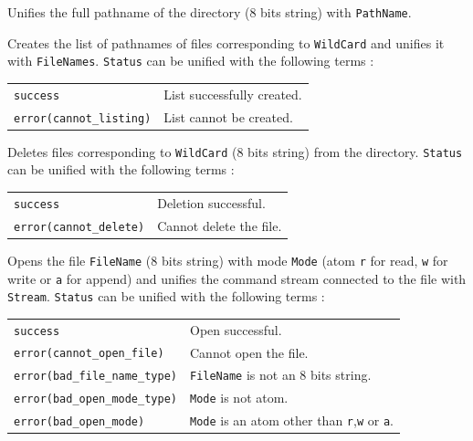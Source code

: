 \begin{itemize}

Unifies the full pathname of the directory (8 bits string)
with \verb|PathName|.

Creates the list of pathnames of files corresponding to \verb|WildCard|
and unifies it with \verb|FileNames|. \verb|Status| can be unified with the
following terms :

\vspace{1ex}
\hspace*{15mm}\begin{tabular}{l@{ $\cdots$ }l}
\verb|success| & List successfully created.\\
\verb|error(cannot_listing)| & List cannot be created.\\
\end{tabular}
\vspace{1ex}

Deletes files corresponding to \verb|WildCard| (8 bits string) from
the directory. \verb|Status| can be unified with the following terms :

\vspace{1ex}
\hspace*{15mm}\begin{tabular}{l@{ $\cdots$ }l}
\verb|success| & Deletion successful.\\
\verb|error(cannot_delete)| & Cannot delete the file.\\
\end{tabular}
\vspace{1ex}

Opens the file \verb|FileName| (8 bits string) with mode \verb|Mode|
(atom \verb|r| for read, \verb|w| for write or
\verb|a| for append) and unifies the command stream connected to the file
with \verb|Stream|.
\verb|Status| can be unified with the following terms :

\vspace{1ex}
\hspace*{15mm}\begin{tabular}{l@{ $\cdots$ }l}
\verb|success| & Open successful.\\
\verb|error(cannot_open_file)| & Cannot open the file.\\
\verb|error(bad_file_name_type)| & \verb|FileName| is not an 8 bits string.\\
\verb|error(bad_open_mode_type)| & \verb|Mode| is not atom.\\
\verb|error(bad_open_mode)| 
	& \verb|Mode| is an atom other than \verb|r|,\verb|w| or \verb|a|.
\end{tabular}
\end{itemize}

